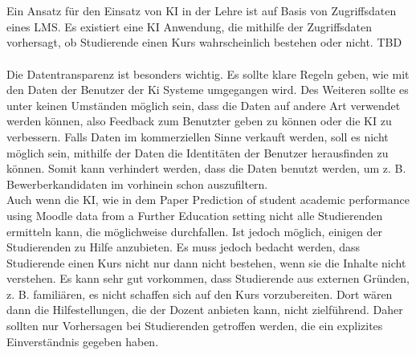 \\
\\ \noindent
Ein Ansatz für den Einsatz von KI in der Lehre ist auf Basis von Zugriffsdaten eines \ac{LMS}.
Es existiert eine KI Anwendung, die mithilfe der Zugriffsdaten vorhersagt, ob Studierende einen Kurs wahrscheinlich bestehen oder nicht. TBD
\\
\\ \noindent
Die Datentransparenz ist besonders wichtig.
Es sollte klare Regeln geben, wie mit den Daten der Benutzer der Ki Systeme umgegangen wird.
Des Weiteren sollte es unter keinen Umständen möglich sein, dass die Daten auf andere Art verwendet werden können, also Feedback zum Benutzter geben zu können oder die KI zu verbessern.
Falls Daten im kommerziellen Sinne verkauft werden, soll es nicht möglich sein, mithilfe der Daten die Identitäten der Benutzer herausfinden zu können.
Somit kann verhindert werden, dass die Daten benutzt werden, um z. B. Bewerberkandidaten im vorhinein schon auszufiltern. %
\\ \noindent
Auch wenn die KI, wie in dem Paper \glqq{} Prediction of student academic performance using Moodle data from a Further Education setting \grqq{} nicht alle Studierenden ermitteln kann, die möglichweise durchfallen.%
Ist jedoch möglich, einigen der Studierenden zu Hilfe anzubieten. Es muss jedoch bedacht werden, dass Studierende einen Kurs nicht nur dann nicht bestehen, wenn sie die Inhalte nicht verstehen.
Es kann sehr gut vorkommen, dass Studierende aus externen Gründen, z. B. familiären, es nicht schaffen sich auf den Kurs vorzubereiten.
Dort wären dann die Hilfestellungen, die der Dozent anbieten kann, nicht zielführend.
Daher sollten nur Vorhersagen bei Studierenden getroffen werden, die ein explizites Einverständnis gegeben haben.